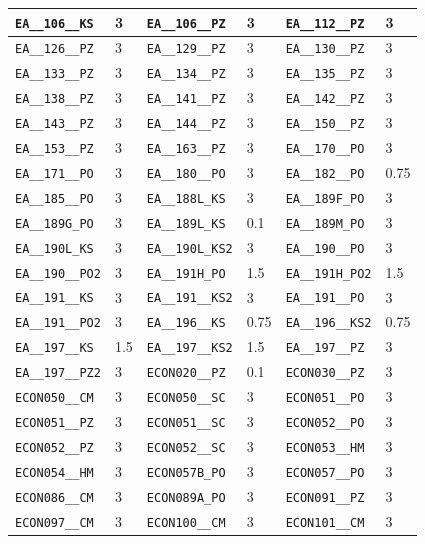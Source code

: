 \begin{longtable}{|l|l||l|l||l|l|}
    \verb|EA__106__KS| & 3 & \verb|EA__106__PZ| & 3 & \verb|EA__112__PZ| & 3\\\hline
    \verb|EA__126__PZ| & 3 & \verb|EA__129__PZ| & 3 & \verb|EA__130__PZ| & 3\\\hline
    \verb|EA__133__PZ| & 3 & \verb|EA__134__PZ| & 3 & \verb|EA__135__PZ| & 3\\\hline
    \verb|EA__138__PZ| & 3 & \verb|EA__141__PZ| & 3 & \verb|EA__142__PZ| & 3\\\hline
    \verb|EA__143__PZ| & 3 & \verb|EA__144__PZ| & 3 & \verb|EA__150__PZ| & 3\\\hline
    \verb|EA__153__PZ| & 3 & \verb|EA__163__PZ| & 3 & \verb|EA__170__PO| & 3\\\hline
    \verb|EA__171__PO| & 3 & \verb|EA__180__PO| & 3 & \verb|EA__182__PO| & 0.75\\\hline
    \verb|EA__185__PO| & 3 & \verb|EA__188L_KS| & 3 & \verb|EA__189F_PO| & 3\\\hline
    \verb|EA__189G_PO| & 3 & \verb|EA__189L_KS| & 0.1 & \verb|EA__189M_PO| & 3\\\hline
    \verb|EA__190L_KS| & 3 & \verb|EA__190L_KS2| & 3 & \verb|EA__190__PO| & 3\\\hline
    \verb|EA__190__PO2| & 3 & \verb|EA__191H_PO| & 1.5 & \verb|EA__191H_PO2| & 1.5\\\hline
    \verb|EA__191__KS| & 3 & \verb|EA__191__KS2| & 3 & \verb|EA__191__PO| & 3\\\hline
    \verb|EA__191__PO2| & 3 & \verb|EA__196__KS| & 0.75 & \verb|EA__196__KS2| & 0.75\\\hline
    \verb|EA__197__KS| & 1.5 & \verb|EA__197__KS2| & 1.5 & \verb|EA__197__PZ| & 3\\\hline
    \verb|EA__197__PZ2| & 3 & \verb|ECON020__PZ| & 0.1 & \verb|ECON030__PZ| & 3\\\hline
    \verb|ECON050__CM| & 3 & \verb|ECON050__SC| & 3 & \verb|ECON051__PO| & 3\\\hline
    \verb|ECON051__PZ| & 3 & \verb|ECON051__SC| & 3 & \verb|ECON052__PO| & 3\\\hline
    \verb|ECON052__PZ| & 3 & \verb|ECON052__SC| & 3 & \verb|ECON053__HM| & 3\\\hline
    \verb|ECON054__HM| & 3 & \verb|ECON057B_PO| & 3 & \verb|ECON057__PO| & 3\\\hline
    \verb|ECON086__CM| & 3 & \verb|ECON089A_PO| & 3 & \verb|ECON091__PZ| & 3\\\hline
    \verb|ECON097__CM| & 3 & \verb|ECON100__CM| & 3 & \verb|ECON101__CM| & 3\\\hline

\end{longtable}
